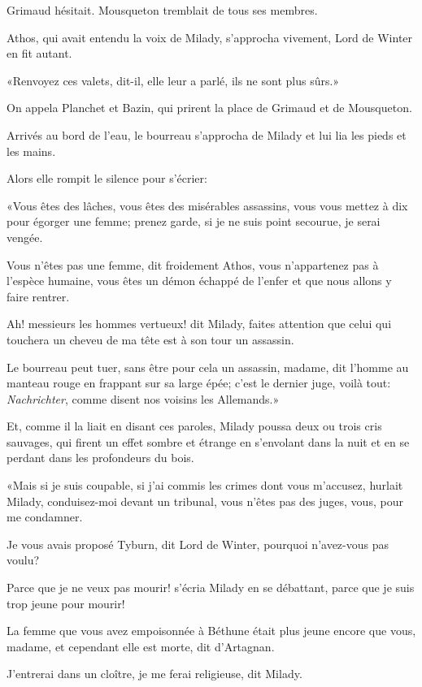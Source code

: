 Grimaud hésitait. Mousqueton tremblait de tous ses membres. 

Athos, qui avait entendu la voix de Milady, s'approcha vivement, Lord de Winter en fit autant. 

«Renvoyez ces valets, dit-il, elle leur a parlé, ils ne sont plus sûrs.» 

On appela Planchet et Bazin, qui prirent la place de Grimaud et de Mousqueton. 

Arrivés au bord de l'eau, le bourreau s'approcha de Milady et lui lia les pieds et les mains. 

Alors elle rompit le silence pour s'écrier: 

«Vous êtes des lâches, vous êtes des misérables assassins, vous vous mettez à dix pour égorger une femme; prenez garde, si je ne suis point secourue, je serai vengée. 

\speak  Vous n'êtes pas une femme, dit froidement Athos, vous n'appartenez pas à l'espèce humaine, vous êtes un démon échappé de l'enfer et que nous allons y faire rentrer. 

\speak  Ah! messieurs les hommes vertueux! dit Milady, faites attention que celui qui touchera un cheveu de ma tête est à son tour un assassin. 

\speak  Le bourreau peut tuer, sans être pour cela un assassin, madame, dit l'homme au manteau rouge en frappant sur sa large épée; c'est le dernier juge, voilà tout: \textit{Nachrichter}, comme disent nos voisins les Allemands.» 

Et, comme il la liait en disant ces paroles, Milady poussa deux ou trois cris sauvages, qui firent un effet sombre et étrange en s'envolant dans la nuit et en se perdant dans les profondeurs du bois. 

«Mais si je suis coupable, si j'ai commis les crimes dont vous m'accusez, hurlait Milady, conduisez-moi devant un tribunal, vous n'êtes pas des juges, vous, pour me condamner. 

\speak  Je vous avais proposé Tyburn, dit Lord de Winter, pourquoi n'avez-vous pas voulu? 

\speak  Parce que je ne veux pas mourir! s'écria Milady en se débattant, parce que je suis trop jeune pour mourir! 

\speak  La femme que vous avez empoisonnée à Béthune était plus jeune encore que vous, madame, et cependant elle est morte, dit d'Artagnan. 

\speak  J'entrerai dans un cloître, je me ferai religieuse, dit Milady. 

